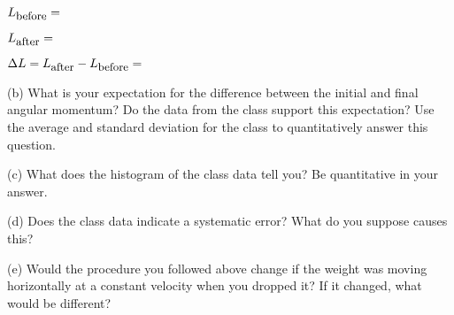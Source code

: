 \( L_{\mbox{\small before}}= \)  
\vspace{5mm}

\( L_{\mbox{\small after}}= \)
\vspace{5mm}

\( \Delta L= L_{\mbox{\small after}} - L_{\mbox{\small before}} = \)  
\vspace{15mm}

(b) What is your expectation for the difference between the initial and final angular momentum?
Do the data from the class support this expectation? 
Use the average and standard deviation for the class to quantitatively answer this question.
\vspace{20mm}

(c) What does the histogram of the class data tell you? Be quantitative in your answer.
\vspace{20mm}

(d) Does the class data indicate a systematic error?  What do you suppose causes this?
\vspace{20mm}

(e) Would the procedure you followed above change if the weight was moving horizontally at a constant velocity when you dropped it? 
If it changed, what would be different?
\vspace{20mm}

